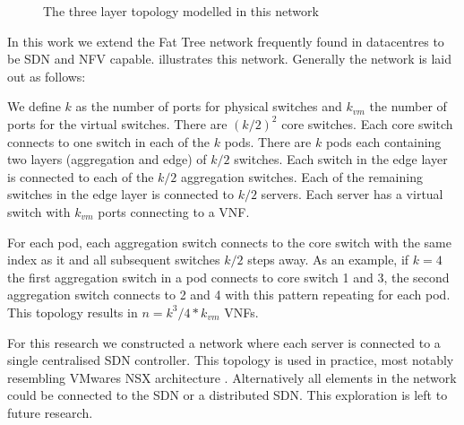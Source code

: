 \begin{figure}

\caption{The three layer topology modelled in this network}

\end{figure}

In this work we extend the Fat Tree network \cite{Al-FaresLV08} frequently found in datacentres \cite{} to be SDN and NFV capable.  illustrates this network. Generally the network is laid out as follows:

We define $k$ as the number of ports for physical switches and $k_{vm}$ the number of ports for the virtual switches. There are $(k/2)^2$ core switches. Each core switch connects to one switch in each of the $k$ pods. There are $k$ pods each containing two layers (aggregation and edge) of $k/2$ switches. Each switch in the edge layer is connected to each of the $k/2$ aggregation switches. Each of the remaining switches in the edge layer is connected to $k/2$ servers. Each server has a virtual switch with $k_{vm}$ ports connecting to a VNF.

For each pod, each aggregation switch connects to the core switch with the same index as it and all subsequent switches $k/2$ steps away. As an example, if $k=4$ the first aggregation switch in a pod connects to core switch 1 and 3, the second aggregation switch connects to 2 and 4 with this pattern repeating for each pod. This topology results in $n=k^3/4 * k_{vm}$ VNFs.

For this research we constructed a network where each server is connected to a single centralised SDN controller. This topology is used in practice, most notably resembling VMwares NSX architecture \cite{}. Alternatively all elements in the network could be connected to the SDN \cite{} or a distributed SDN. This exploration is left to future research.